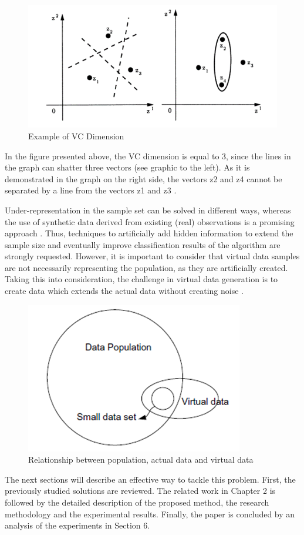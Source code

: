 \documentclass[parskip=full]{scrartcl}
\begin{document}
\begin{figure}[h]
	\centering
	\includegraphics[width=0.6\linewidth]{"VC Dimension"}
	\caption{Example of VC Dimension \cite{Vapnik.2008}}
	\label{fig:vc-dimension}
\end{figure}

In the figure presented above, the VC dimension is equal to 3, since the lines in the graph can shatter three vectors (see graphic to the left). As it is demonstrated in the graph on the right side, the vectors z{\tiny 2} and z{\tiny 4} cannot be separated by a line from the vectors z{\tiny 1} and z{\tiny 3} \cite{Vapnik.2008}.

Under-representation in the sample set can be solved in different ways, whereas the use of synthetic data derived from existing (real) observations is a promising approach \cite{Sezer.2014}. Thus, techniques to artificially add hidden information to extend the sample size and eventually improve classification results of the algorithm are strongly requested. However, it is important to consider that virtual data samples are not necessarily representing the population, as they are artificially created. Taking this into consideration, the challenge in virtual data generation is to create data which extends the actual data without creating noise \cite{Li.2006}. 

\begin{figure}[h]
	\centering
	\includegraphics[width=0.35\linewidth]{Relationship}
	\caption{Relationship between population, actual data and virtual data \cite{Li.2006}}
	\label{fig:relationship}
\end{figure}

The next sections will describe an effective way to tackle this problem. First, the previously studied solutions are reviewed. The related work in Chapter 2 is followed by the detailed description of the proposed method, the research methodology and the experimental results. Finally, the paper is concluded by an analysis of the experiments in Section 6.
\end{document}
